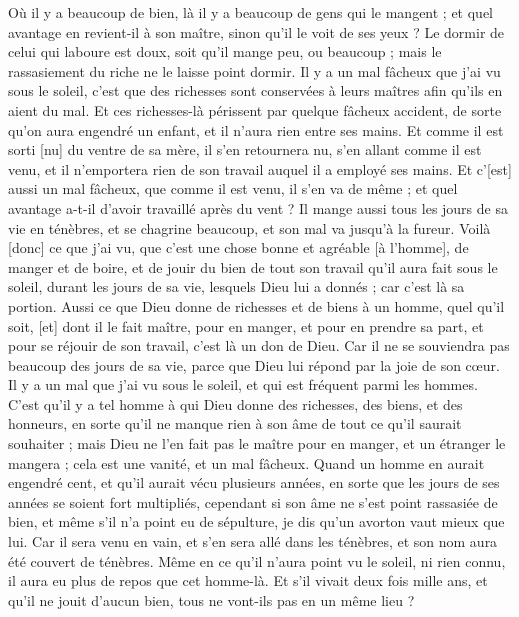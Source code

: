 \begin{multicols}{2}
Où il y a beaucoup de bien, là il y a beaucoup de gens qui le mangent ; et quel avantage en revient-il à son maître, sinon qu'il le voit de ses yeux ?
Le dormir de celui qui laboure est doux, soit qu'il mange peu, ou beaucoup ; mais le rassasiement du riche ne le laisse point dormir.
Il y a un mal fâcheux que j'ai vu sous le soleil, c'est que des richesses sont conservées à leurs maîtres afin qu'ils en aient du mal.
Et ces richesses-là périssent par quelque fâcheux accident, de sorte qu'on aura engendré un enfant, et il n'aura rien entre ses mains.
Et comme il est sorti [nu] du ventre de sa mère, il s'en retournera nu, s'en allant comme il est venu, et il n'emportera rien de son travail auquel il a employé ses mains.
Et c'[est] aussi un mal fâcheux, que comme il est venu, il s'en va de même ; et quel avantage a-t-il d'avoir travaillé après du vent ?
Il mange aussi tous les jours de sa vie en ténèbres, et se chagrine beaucoup, et son mal va jusqu'à la fureur.
Voilà [donc] ce que j'ai vu, que c'est une chose bonne et agréable [à l'homme], de manger et de boire, et de jouir du bien de tout son travail qu'il aura fait sous le soleil, durant les jours de sa vie, lesquels Dieu lui a donnés ; car c'est là sa portion.
Aussi ce que Dieu donne de richesses et de biens à un homme, quel qu'il soit, [et] dont il le fait maître, pour en manger, et pour en prendre sa part, et pour se réjouir de son travail, c'est là un don de Dieu.
Car il ne se souviendra pas beaucoup des jours de sa vie, parce que Dieu lui répond par la joie de son cœur.
\VerseOne{}Il y a un mal que j'ai vu sous le soleil, et qui est fréquent parmi les hommes.
C'est qu'il y a tel homme à qui Dieu donne des richesses, des biens, et des honneurs, en sorte qu'il ne manque rien à son âme de tout ce qu'il saurait souhaiter ; mais Dieu ne l'en fait pas le maître pour en manger, et un étranger le mangera ; cela est une vanité, et un mal fâcheux.
Quand un homme en aurait engendré cent, et qu'il aurait vécu plusieurs années, en sorte que les jours de ses années se soient fort multipliés, cependant si son âme ne s'est point rassasiée de bien, et même s'il n'a point eu de sépulture, je dis qu'un avorton vaut mieux que lui.
Car il sera venu en vain, et s'en sera allé dans les ténèbres, et son nom aura été couvert de ténèbres.
Même en ce qu'il n'aura point vu le soleil, ni rien connu, il aura eu plus de repos que cet homme-là.
Et s'il vivait deux fois mille ans, et qu'il ne jouit d'aucun bien, tous ne vont-ils pas en un même lieu ?

\end{multicols}
